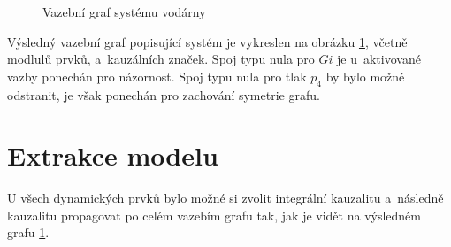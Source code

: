 \documentclass[conference]{IEEEtran}
\begin{document}
\begin{figure}[htbp]
    \caption{Vazební graf systému vodárny}
    \label{fig:vazebni_graf}
\end{figure}

Výsledný vazební graf popisující systém je vykreslen na obrázku \ref{fig:vazebni_graf}, včetně modlulů prvků, 
 a~kauzálních značek. Spoj typu nula pro $Gi$ je u~aktivované vazby ponechán
pro názornost. Spoj typu nula pro tlak $p_4$ by bylo možné odstranit, je však ponechán pro zachování symetrie grafu.


\section{Extrakce modelu}
U všech dynamických prvků bylo možné si zvolit integrální kauzalitu a~následně kauzalitu propagovat po celém vazebím grafu
tak, jak je vidět na výsledném grafu \ref{fig:vazebni_graf}.
\end{document}
